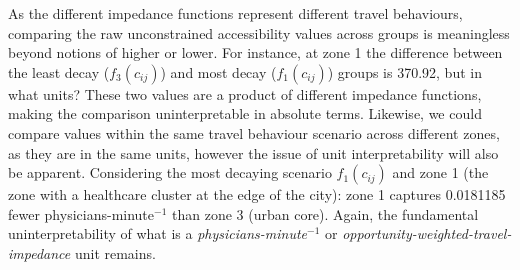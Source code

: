 \documentclass[
  10pt,
  letterpaper,
]{article}
\begin{document}
\begin{table}

\caption{\label{tbl-simple-example-unconstrained-accessibility}Simple
system: unconstrained accessibility.}


\end{table}%

As the different impedance functions represent different travel
behaviours, comparing the raw unconstrained accessibility values across
groups is meaningless beyond notions of higher or lower. For instance,
at zone 1 the difference between the least decay (\(f_3(c_{ij})\)) and
most decay (\(f_1(c_{ij})\)) groups is 370.92, but in what units? These
two values are a product of different impedance functions, making the
comparison uninterpretable in absolute terms. Likewise, we could compare
values within the same travel behaviour scenario across different zones,
as they are in the same units, however the issue of unit
interpretability will also be apparent. Considering the most decaying
scenario \(f_1(c_{ij})\) and zone 1 (the zone with a healthcare cluster
at the edge of the city): zone 1 captures 0.0181185 fewer
physicians-minute\(^{-1}\) than zone 3 (urban core). Again, the
fundamental uninterpretability of what is a
\emph{physicians-minute\(^{-1}\)} or
\emph{opportunity-weighted-travel-impedance} unit remains.
\end{document}
